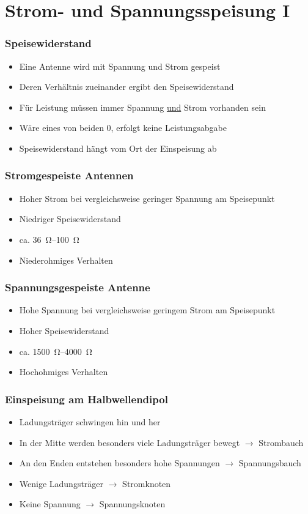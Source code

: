 
\section{Strom- und Spannungsspeisung I}
\label{section:strom_spannung_speisung_1}
\begin{frame}%

\frametitle{Speisewiderstand}
\begin{itemize}
  \item Eine Antenne wird mit Spannung und Strom gespeist
  \item Deren Verhältnis zueinander ergibt den Speisewiderstand
  \item Für Leistung müssen immer Spannung \underline{und} Strom vorhanden sein
  \item Wäre eines von beiden 0, erfolgt keine Leistungsabgabe
  \item Speisewiderstand hängt vom Ort der Einspeisung ab
  \end{itemize}

\end{frame}

\begin{frame}
\frametitle{Stromgespeiste Antennen}
\begin{itemize}
  \item Hoher Strom bei vergleichsweise geringer Spannung am Speisepunkt
  \item Niedriger Speisewiderstand
  \item ca. \qtyrange{36}{100}{\ohm}
  \item Niederohmiges Verhalten
  \end{itemize}
\end{frame}

\begin{frame}
\frametitle{Spannungsgespeiste Antenne}
\begin{itemize}
  \item Hohe Spannung bei vergleichsweise geringem Strom am Speisepunkt
  \item Hoher Speisewiderstand
  \item ca. \qtyrange{1500}{4000}{\ohm}
  \item Hochohmiges Verhalten
  \end{itemize}
\end{frame}

\begin{frame}
\frametitle{Einspeisung am Halbwellendipol}
\begin{itemize}
  \item Ladungsträger schwingen hin und her
  \item In der Mitte werden besonders viele Ladungsträger bewegt $\rightarrow$ Strombauch
  \item An den Enden entstehen besonders hohe Spannungen $\rightarrow$ Spannungsbauch
  \item Wenige Ladungsträger $\rightarrow$ Stromknoten
  \item Keine Spannung $\rightarrow$ Spannungsknoten
  \end{itemize}

\end{frame}

